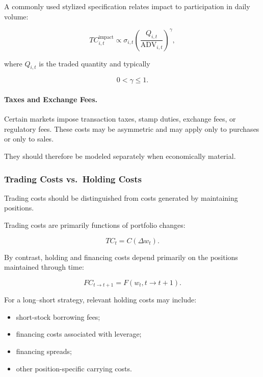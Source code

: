 \documentclass[11pt,a4paper]{article}
\begin{document}
A commonly used stylized specification relates impact to participation in
daily volume:

\begin{equation}
TC_{i,t}^{\mathrm{impact}}
\propto
\sigma_{i,t}
\left(
\frac{
Q_{i,t}
}{
\mathrm{ADV}_{i,t}
}
\right)^{\gamma},
\end{equation}

where $Q_{i,t}$ is the traded quantity and typically

\begin{equation}
0<\gamma\leq 1.
\end{equation}


\paragraph{Taxes and Exchange Fees.}

Certain markets impose transaction taxes, stamp duties, exchange fees, or
regulatory fees. These costs may be asymmetric and may apply only to purchases
or only to sales.

They should therefore be modeled separately when economically material.


\subsubsection{Trading Costs vs.\ Holding Costs}

Trading costs should be distinguished from costs generated by maintaining
positions.

Trading costs are primarily functions of portfolio changes:

\begin{equation}
TC_t
=
C(\Delta w_t).
\end{equation}

By contrast, holding and financing costs depend primarily on the positions
maintained through time:

\begin{equation}
FC_{t\rightarrow t+1}
=
F
\left(
w_t,
t\rightarrow t+1
\right).
\end{equation}

For a long--short strategy, relevant holding costs may include:

\begin{itemize}
    \item short-stock borrowing fees;

    \item financing costs associated with leverage;

    \item financing spreads;

    \item other position-specific carrying costs.
\end{itemize}
\end{document}
